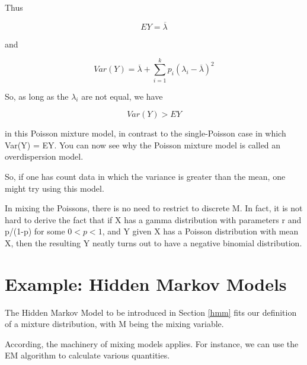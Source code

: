 Thus

\begin{equation}
EY = \overline{\lambda}
\end{equation}

and

\begin{equation}
Var(Y) = \overline{\lambda} + 
\sum_{i=1}^k p_i (\lambda_i - \overline{\lambda})^2
\end{equation}

So, as long as the $\lambda_i$ are not equal, we have

\begin{equation}
Var(Y) > EY
\end{equation}

in this Poisson mixture model, in contrast to the single-Poisson case
in which Var(Y) = EY.  You can now see why the Poisson mixture model is
called an overdispersion model.

So, if one has count data in which the variance is greater than the
mean, one might try using this model.

In mixing the Poissons, there is no need to restrict to discrete M.  In
fact, it is not hard to derive the fact that if X has a gamma
distribution with parameters r and p/(1-p) for some $0 < p < 1$, and Y
given X has a Poisson distribution with mean X, then the resulting Y
neatly turns out to have a negative binomial distribution.

\section{Example:  Hidden Markov Models}

The Hidden Markov Model to be introduced in Section \ref{hmm} fits our
definition of a mixture distribution, with M being the mixing variable.

According, the machinery of mixing models applies.  For instance, we can
use the EM algorithm to calculate various quantities.

% 
% 
% 
% 
% 


